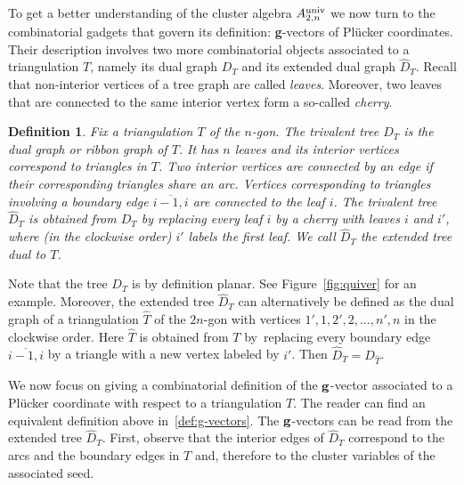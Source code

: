 \documentclass[10pt,a4paper]{amsart}
\newcommand{\thlabel}[1]{\label{#1}}
\newcommand{\thref}[1]{\ref{#1}}
\newtheorem{Definition}[Theorem]{Definition}
\numberwithin{equation}{section}
\begin{document}
To get a better understanding of the cluster algebra $A_{2,n}^{\rm univ}$ we now turn to the combinatorial gadgets that govern its definition: {\bf g}-vectors of Pl\"ucker coordinates.
Their description involves two more combinatorial objects associated to a triangulation $T$, namely its dual graph $D_T$ and its extended dual graph $\widehat D_T$.
Recall that non-interior vertices of a tree graph are called {\it leaves}.
Moreover, two leaves that are connected to the same interior vertex form a so-called {\it cherry}.

\begin{Definition}\thlabel{def:trees}
Fix a triangulation $T$ of the $n$-gon. The trivalent tree $D_T$ is the {\it dual graph} or {\it ribbon graph} of $T$. It has $n$ leaves and its interior vertices correspond to triangles in $T$.
 Two interior vertices are connected by an edge if their corresponding triangles share an arc. Vertices corresponding to triangles involving a boundary edge $\overline{i-1,i}$ are connected to the leaf $i$.
 The trivalent tree $\widehat D_T$
 is obtained from $D_T$ by replacing every leaf $i$ by a cherry with leaves $i$ and $i'$, where (in the clockwise order) $i'$ labels the first leaf.
 We call $\widehat D_T$ the {\it extended tree dual to $T$}.
\end{Definition}
Note that the tree $D_T$ is by definition planar. See Figure~\ref{fig:quiver} for an example.
Moreover, the extended tree $\widehat D_T$ can alternatively be defined as the dual graph of a triangulation $\widehat T$ of the $2n$-gon with vertices $1',1,2',2,\dots,n',n$ in the clockwise order.
Here $\widehat T$ is obtained from $T$ by~replacing every boundary edge $\overline{i-1,i}$ by a triangle with a new vertex labeled by $i'$.
Then $\widehat{D}_T=D_{\widehat{T}}$.


We now focus on giving a combinatorial definition of the ${\bf g}$-vector associated to a Pl\"ucker coordinate with respect to a triangulation $T$.
The reader can find an equivalent definition above in~\thref{def:g-vectors}. The ${\bf g}$-vectors can be read from the extended tree $\widehat D_T$.
First, observe that the interior edges of $\widehat D_T$ correspond to the arcs and the boundary edges in $T$ and, therefore to the cluster variables of the associated seed.

\medskip
\end{document}
